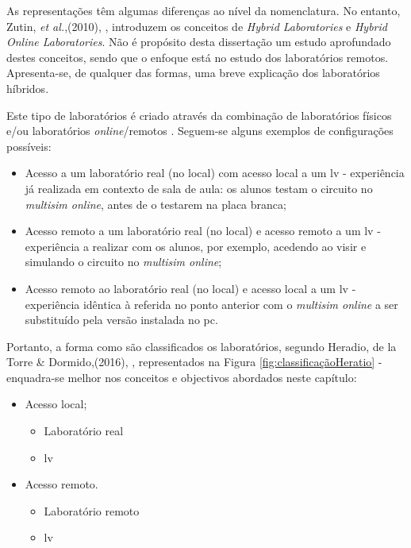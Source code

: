 As representações têm algumas diferenças ao nível da nomenclatura. No entanto, Zutin, \textit{et al.},(2010), \cite{zutinlab2go}, introduzem os conceitos de \textit{Hybrid Laboratories} e \textit{Hybrid Online Laboratories}.
Não é propósito desta dissertação um estudo aprofundado destes conceitos, sendo que o enfoque está no estudo dos laboratórios remotos. Apresenta-se, de qualquer das formas, uma breve explicação dos laboratórios híbridos.

Este tipo de laboratórios é criado através da combinação de laboratórios físicos e/ou laboratórios \textit{online}/remotos \cite{Zapata-Rivera}. Seguem-se alguns exemplos de configurações possíveis:
\begin{itemize}
    \item Acesso a um laboratório real (no local) com acesso local a um \acrfull{lv} - experiência já realizada em contexto de sala de aula: os alunos testam o circuito no \textit{multisim online}, antes de o testarem na placa branca;
    \item Acesso remoto a um laboratório real (no local) e acesso remoto a um \acrshort{lv} - experiência a realizar com os alunos, por exemplo, acedendo ao \acrshort{visir} e simulando o circuito no \textit{multisim online};
    \item Acesso remoto ao laboratório real (no local) e acesso local a um \acrshort{lv} - experiência idêntica à referida no ponto anterior com o \textit{multisim online} a ser substituído pela versão instalada no \acrshort{pc}.
\end{itemize}

Portanto, a forma como são classificados os laboratórios, segundo Heradio, de la Torre \& Dormido,(2016), \cite{HERADIO20161}, representados na Figura \ref{fig:classificaçãoHeratio} - enquadra-se melhor nos conceitos e objectivos abordados neste capítulo:
\begin{itemize}
    \item Acesso local;
          \begin{itemize}
              \item Laboratório real
              \item \acrshort{lv}
          \end{itemize}
    \item Acesso remoto.
          \begin{itemize}
              \item Laboratório remoto
              \item \acrshort{lv}
          \end{itemize}
\end{itemize}

